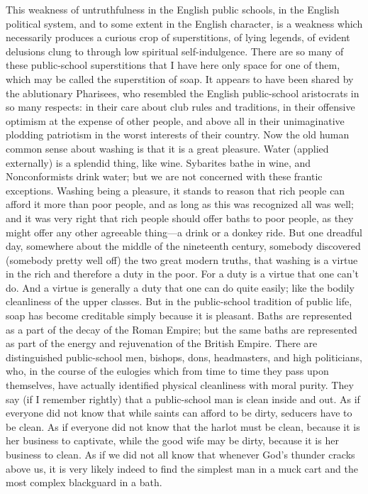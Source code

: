 \documentclass{book}
\begin{document}
This weakness of untruthfulness in the English public schools, in the English political system, and to some extent in the English character, is a weakness which necessarily produces a curious crop of superstitions, of lying legends, of evident delusions clung to through low spiritual self-indulgence. There are so many of these public-school superstitions that I have here only space for one of them, which may be called the superstition of soap. It appears to have been shared by the ablutionary Pharisees, who resembled the English public-school aristocrats in so many respects: in their care about club rules and traditions, in their offensive optimism at the expense of other people, and above all in their unimaginative plodding patriotism in the worst interests of their country. Now the old human common sense about washing is that it is a great pleasure. Water (applied externally) is a splendid thing, like wine. Sybarites bathe in wine, and Nonconformists drink water; but we are not concerned with these frantic exceptions. Washing being a pleasure, it stands to reason that rich people can afford it more than poor people, and as long as this was recognized all was well; and it was very right that rich people should offer baths to poor people, as they might offer any other agreeable thing—a drink or a donkey ride. But one dreadful day, somewhere about the middle of the nineteenth century, somebody discovered (somebody pretty well off) the two great modern truths, that washing is a virtue in the rich and therefore a duty in the poor. For a duty is a virtue that one can’t do. And a virtue is generally a duty that one can do quite easily; like the bodily cleanliness of the upper classes. But in the public-school tradition of public life, soap has become creditable simply because it is pleasant. Baths are represented as a part of the decay of the Roman Empire; but the same baths are represented as part of the energy and rejuvenation of the British Empire. There are distinguished public-school men, bishops, dons, headmasters, and high politicians, who, in the course of the eulogies which from time to time they pass upon themselves, have actually identified physical cleanliness with moral purity. They say (if I remember rightly) that a public-school man is clean inside and out. As if everyone did not know that while saints can afford to be dirty, seducers have to be clean. As if everyone did not know that the harlot must be clean, because it is her business to captivate, while the good wife may be dirty, because it is her business to clean. As if we did not all know that whenever God’s thunder cracks above us, it is very likely indeed to find the simplest man in a muck cart and the most complex blackguard in a bath.
\end{document}
